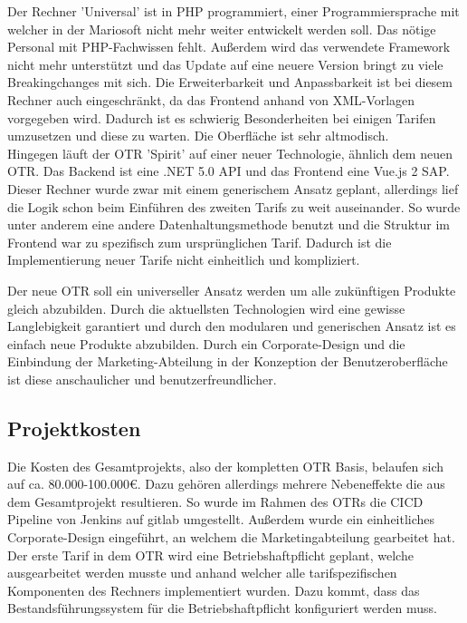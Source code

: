 Der Rechner 'Universal' ist in PHP programmiert, einer Programmiersprache mit welcher in der Mariosoft nicht mehr weiter entwickelt werden soll. Das nötige Personal mit PHP-Fachwissen fehlt. Außerdem wird das verwendete Framework nicht mehr unterstützt und das Update auf eine neuere Version bringt zu viele Breakingchanges mit sich. Die Erweiterbarkeit und Anpassbarkeit ist bei diesem Rechner auch eingeschränkt, da das Frontend anhand von XML-Vorlagen vorgegeben wird. Dadurch ist es schwierig Besonderheiten bei einigen Tarifen umzusetzen und diese zu warten. Die Oberfläche ist sehr altmodisch. \\
Hingegen läuft der \ac{OTR} 'Spirit' auf einer neuer Technologie, ähnlich dem neuen \ac{OTR}. Das Backend ist eine .NET 5.0 API und das Frontend eine Vue.js 2 \ac{SAP}. Dieser Rechner wurde zwar mit einem generischem Ansatz geplant, allerdings lief die Logik schon beim Einführen des zweiten Tarifs zu weit auseinander. So wurde unter anderem eine andere Datenhaltungsmethode benutzt und die Struktur im Frontend war zu spezifisch zum ursprünglichen Tarif. Dadurch ist die Implementierung neuer Tarife nicht einheitlich und kompliziert.

Der neue \ac{OTR} soll ein universeller Ansatz werden um alle zukünftigen Produkte gleich abzubilden. Durch die aktuellsten Technologien wird eine gewisse Langlebigkeit garantiert und durch den modularen und generischen Ansatz ist es einfach neue Produkte abzubilden. Durch ein Corporate-Design und die Einbindung der Marketing-Abteilung in der Konzeption der Benutzeroberfläche ist diese anschaulicher und benutzerfreundlicher.


\subsection{Projektkosten}
\label{projektkosten}
Die Kosten des Gesamtprojekts, also der kompletten \ac{OTR} Basis, belaufen sich auf ca. 80.000-100.000€. Dazu gehören allerdings mehrere Nebeneffekte die aus dem Gesamtprojekt  resultieren. So wurde im Rahmen des \ac{OTR}s die \ac{CICD} Pipeline von Jenkins auf \gls{gitlab} umgestellt. Außerdem wurde ein einheitliches Corporate-Design eingeführt, an welchem die Marketingabteilung gearbeitet hat. Der erste Tarif in dem \ac{OTR} wird eine Betriebshaftpflicht geplant, welche ausgearbeitet werden musste und anhand welcher alle tarifspezifischen Komponenten des Rechners implementiert wurden. Dazu kommt, dass das Bestandsführungssystem für die Betriebshaftpflicht konfiguriert werden muss.\\

